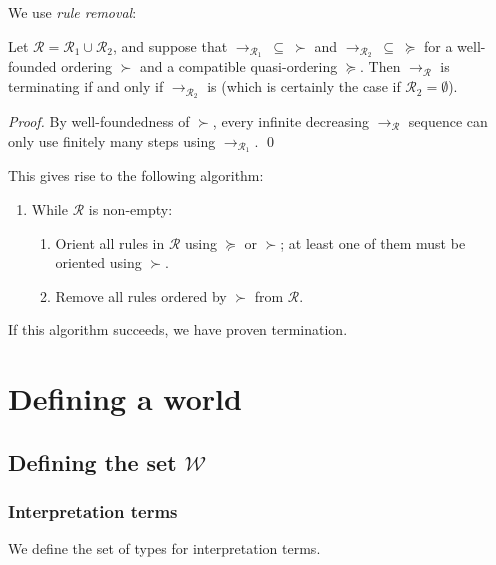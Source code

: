 \documentclass[runningheads,a4paper]{llncs}
\newcommand{\World}{\mathcal{W}}
\newcommand{\Rules}{\mathcal{R}}
\newcommand{\arr}[1]{\to_{#1}}
\begin{document}
\renewcommand{\theenumii}{\alph{enumii}}

We use \emph{rule removal}:

\begin{theorem}\label{thm:ruleremove}
Let $\Rules = \Rules_1 \cup \Rules_2$, and suppose that $\arr{\Rules_1}\:
\subseteq\:\succ$ and $\arr{\Rules_2}\:\subseteq\:\succeq$ for a
well-founded ordering $\succ$ and a compatible quasi-ordering $\succeq$.
Then $\arr{\Rules}$ is terminating if and only if $\arr{\Rules_2}$ is
(which is certainly the case if $\Rules_2 = \emptyset$).
\end{theorem}

\begin{proof}
By well-foundedness of $\succ$, every infinite decreasing $\arr{\Rules}$
sequence can only use finitely many steps using $\arr{\Rules_1}$.
\qed
\end{proof}

This gives rise to the following algorithm:
\begin{enumerate}
\item While $\Rules$ is non-empty:
  \begin{enumerate}
  \item Orient all rules in $\Rules$ using $\succeq$ or $\succ$; at least
    one of them must be oriented using $\succ$.
  \item Remove all rules ordered by $\succ$ from $\Rules$.
  \end{enumerate}
\end{enumerate}
If this algorithm succeeds, we have proven termination.

\section{Defining a world}

\subsection{Defining the set $\World$}

\subsubsection{Interpretation terms}
We define the set of types for interpretation terms.
\end{document}
